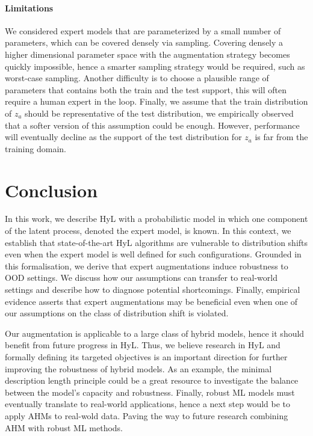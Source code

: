 \documentclass{article}
\begin{document}
\paragraph{Limitations}
We considered expert models that are parameterized by a small number of parameters, which can be covered densely via sampling. Covering densely a higher dimensional parameter space with the augmentation strategy becomes quickly impossible, hence a smarter sampling strategy would be required, such as worst-case sampling. Another difficulty is to choose a plausible range of parameters that contains both the train and the test support, this will often require a human expert in the loop. Finally, we assume that the train distribution of $z_a$ should be representative of the test distribution, we empirically observed that a softer version of this assumption could be enough. However, performance will eventually decline as the support of the test distribution for $z_a$ is far from the training domain.

\section{Conclusion}
In this work, we describe HyL with a probabilistic model in which one component of the latent process, denoted the expert model, is known. In this context, we establish that state-of-the-art HyL algorithms are vulnerable to distribution shifts even when the expert model is well defined for such configurations. Grounded in this formalisation, we derive that expert augmentations induce robustness to OOD settings. We discuss how our assumptions can transfer to real-world settings and describe how to diagnose potential shortcomings. Finally, empirical evidence asserts that expert augmentations may be beneficial even when one of our assumptions on the class of distribution shift is violated.

Our augmentation is applicable to a large class of hybrid models, hence it should benefit from future progress in HyL. Thus, we believe research in HyL and formally defining its targeted objectives is an important direction for further improving the robustness of hybrid models. As an example, the minimal description length principle \citep{mdl_book} could be a great resource to investigate the balance between the model's capacity and robustness. Finally, robust ML models must eventually translate to real-world applications, hence a next step would be to apply AHMs to real-wold data. Paving the way to future research combining AHM with robust ML methods. 
\end{document}
